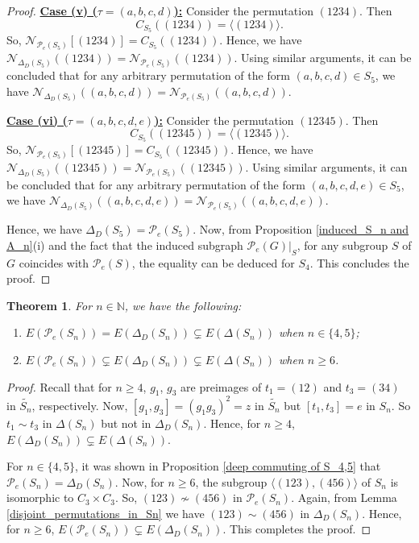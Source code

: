 \documentclass[12pt,a4paper]{article}
\newtheorem{theorem}{Theorem}[section]
\begin{document}
\begin{proof}
\vspace{.3cm}
\noindent\underline{\bf{Case (v) ($\tau=(a,b,c,d)$):}} Consider the permutation $(1234)$. Then \[C_{S_5}((1234))=\langle (1234)\rangle.\] So, $\mathcal{N}_{\mathcal{P}_e(S_5)}[(1234)]=C_{S_5}((1234))$. Hence, we have $\mathcal{N}_{\Delta_D(S_5)}((1234))=\mathcal{N}_{\mathcal{P}_e(S_5)}((1234))$. Using similar arguments, it can be concluded that for any arbitrary permutation of the form $(a,b,c,d)\in S_5$, we have $\mathcal{N}_{\Delta_D(S_5)}((a,b,c,d))=\mathcal{N}_{\mathcal{P}_e(S_5)}((a,b,c,d))$.

\vspace{.3cm}
\noindent\underline{\bf{Case (vi) ($\tau=(a,b,c,d,e)$):}} Consider the permutation $(12345)$. Then \[C_{S_5}((12345))=\langle (12345)\rangle.\] So, $\mathcal{N}_{\mathcal{P}_e(S_5)}[(12345)]=C_{S_5}((12345))$. Hence, we have $\mathcal{N}_{\Delta_D(S_5)}((12345))=\mathcal{N}_{\mathcal{P}_e(S_5)}((12345))$. Using similar arguments, it can be concluded that for any arbitrary permutation of the form $(a,b,c,d,e)\in S_5$, we have $\mathcal{N}_{\Delta_D(S_5)}((a,b,c,d,e))=\mathcal{N}_{\mathcal{P}_e(S_5)}((a,b,c,d,e))$.

Hence, we have $\Delta_D(S_5)=\mathcal{P}_e(S_5)$. Now, from Proposition \ref{induced_S_n and A_n}(i) and the fact that the induced subgraph $\mathcal{P}_e(G)\vert_S$, for any subgroup $S$ of $G$ coincides with $\mathcal{P}_e(S)$, the equality can be deduced for $S_4$. This concludes the proof. 
\end{proof}

\begin{theorem}\label{Containment of Delta_D for S_n}
For $n\in \mathbb{N}$, we have the following:
\begin{enumerate}[\rm (i)]
\item $E(\mathcal{P}_e(S_n))=E(\Delta_D(S_n))\subsetneq E(\Delta(S_n))$ when $n\in\{4,5\}$;
\item $E(\mathcal{P}_e(S_n))\subsetneq E(\Delta_D(S_n))\subsetneq E(\Delta(S_n))$ when $n\geq 6$.
\end{enumerate}
\end{theorem}
\begin{proof}
Recall that for $n\geq 4$, $g_1$, $g_3$ are preimages of $t_1=(12)$ and $t_3=(34)$ in $\tilde{S_n}$, respectively. Now, $[g_1,g_3]=(g_1g_3)^2=z$ in $\tilde{S_n}$ but $[t_1,t_3]=e$ in $S_n$. So $t_1\sim t_3$ in $\Delta(S_n)$ but not in $\Delta_D(S_n)$. Hence, for $n\geq 4$, $E(\Delta_D(S_n))\subsetneq E(\Delta(S_n))$.

For $n\in\{4,5\}$, it was shown in Proposition \ref{deep commuting of S_4,5} that $\mathcal{P}_e(S_n)=\Delta_D(S_n)$. Now, for $n\geq 6$, the subgroup $\langle(123),(456)\rangle$ of $S_n$ is isomorphic to $C_3\times C_3$. So, $(123)\nsim (456)$ in $\mathcal{P}_e(S_n)$. Again, from Lemma \ref{disjoint_permutations_in_Sn} we have $(123)\sim (456)$ in $\Delta_D(S_n)$. Hence, for $n\geq 6$, $E(\mathcal{P}_e(S_n))\subsetneq E(\Delta_D(S_n))$. This completes the proof. 
\end{proof}
\end{document}
